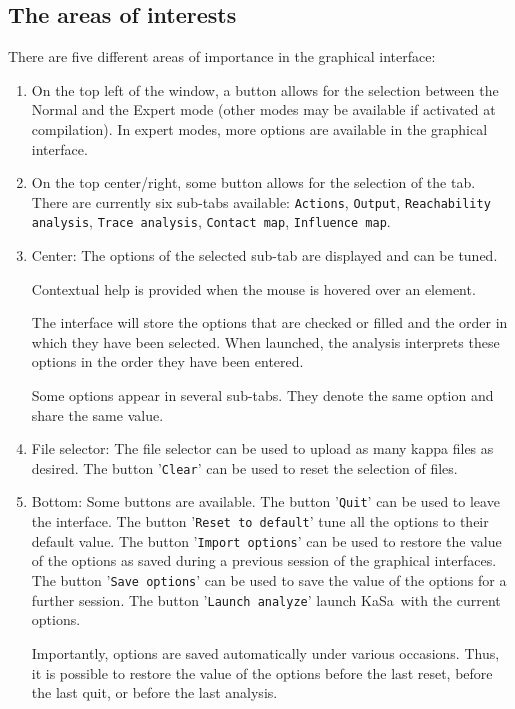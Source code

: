 \documentclass[11pt]{book}
\def\KaSa{\textsf{KaSa}}
\begin{document}
\subsection{The areas of interests}

There are five different areas of importance in the graphical interface:
\begin{enumerate}
\item On the top left of the window, a button allows for the selection between the Normal and the Expert mode (other modes may be available if activated at compilation).
In expert modes, more options are available in the graphical interface.
\item On the top center/right, some button allows for the selection of the tab. There are currently six sub-tabs available: \texttt{Actions}, \texttt{Output}, \texttt{Reachability analysis}, \texttt{Trace analysis}, \texttt{Contact map}, \texttt{Influence map}.

\item Center: The options of the selected sub-tab are displayed and can be tuned.

Contextual help is provided when the mouse is hovered over an element.

The interface will store the options that are checked or filled and the order in which they have been selected.
When launched, the analysis interprets these options in the order they have been entered.

Some options appear in several sub-tabs. They denote the same option and share the same value.

\item File selector: The file selector can be used to upload as many kappa files as desired. The button '\texttt{Clear}' can be used to reset the selection of files.
\item Bottom: Some buttons are available. The button '\texttt{Quit}' can be used to leave the interface. The button '\texttt{Reset to default}' tune all the options to their default value. The button '\texttt{Import options}' can be used to restore the value of the options as saved during a previous session of the graphical interfaces. The button '\texttt{Save options}' can be used to save the value of the options for a further session. The button '\texttt{Launch analyze}' launch \KaSa\ with the current options.

Importantly, options are saved automatically under various occasions. Thus, it is possible to restore the value of the options
before the last reset, before the last quit, or before the last analysis.
\end{enumerate}
\end{document}
